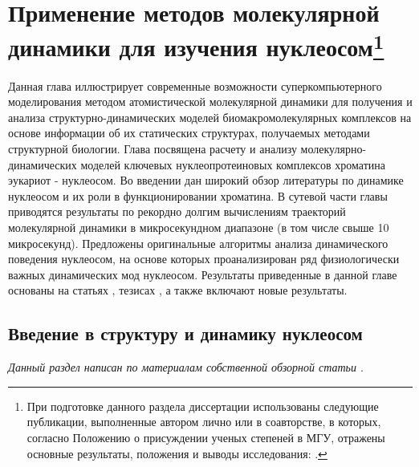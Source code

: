 \chapter[Применение методов молекулярной динамики для изучения нуклеосом]{Применение методов молекулярной динамики для изучения нуклеосом\footnote{При подготовке данного раздела диссертации использованы следующие публикации, выполненные автором лично или в соавторстве, в которых, согласно Положению о присуждении ученых степеней в МГУ, отражены основные результаты, положения и выводы исследования: \cite{shaytan_coupling_2016,hada_histone_2019,bass_effect_2019,armeev_linking_2019,gribkova_investigation_2017,el_kennani_ms_histonedb_2017,shaytan_trajectories_2016,shaytan_coupling_2016,draizen_histonedb_2016,armeev_nucleosome_2016,shaytan_nucleosome_2015,armeev_conformational_2015,armeev_molecular_2015}.}} \label{part2_supermd}

Данная глава иллюстрирует современные возможности суперкомпьютерного моделирования методом атомистической молекулярной динамики для получения и анализа структурно-динамических моделей биомакромолекулярных комплексов на основе информации об их статических структурах, получаемых методами структурной биологии.
Глава посвящена расчету и анализу молекулярно-динамических моделей ключевых нуклеопротеиновых комплексов хроматина эукариот - нуклеосом.
Во введении дан широкий обзор литературы по динамике нуклеосом и их роли в функционировании хроматина. В сутевой части главы приводятся результаты по рекордно долгим вычислениям траекторий молекулярной динамики в микросекундном диапазоне (в том числе свыше 10 микросекунд). Предложены оригинальные алгоритмы анализа динамического поведения нуклеосом, на основе которых проанализирован ряд физиологически важных динамических мод нуклеосом.
Результаты приведенные в данной главе основаны на статьях  \cite{shaytan_coupling_2016,hada_histone_2019,bass_effect_2019,armeev_linking_2019,gribkova_investigation_2017,el_kennani_ms_histonedb_2017,shaytan_trajectories_2016,shaytan_coupling_2016,draizen_histonedb_2016,armeev_nucleosome_2016,shaytan_nucleosome_2015,armeev_conformational_2015,armeev_molecular_2015}, тезисах  \cite{armeev_integrative_2020,gribkova_construction_2019,armeev_analyzing_2019,shaytan_microsecond_2017,shaytan_nucleosome_2016,shaytan_polymorphism_2015,shaytan_combined_2015}, а также включают новые результаты.

\section{Введение в структуру и динамику нуклеосом}
\textit{Данный раздел написан по материалам собственной обзорной статьи \cite{armeev_linking_2019}}.

